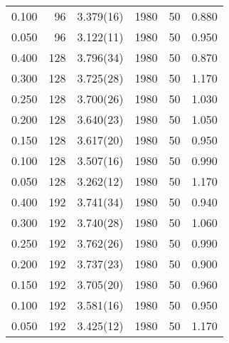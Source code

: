 \begin{tabular}{rrlrrr}
 0.100 &      96 & 3.379(16)  &                1980 &                  50 &    0.880 \\
 0.050 &      96 & 3.122(11)  &                1980 &                  50 &    0.950 \\
 0.400 &     128 & 3.796(34)  &                1980 &                  50 &    0.870 \\
 0.300 &     128 & 3.725(28)  &                1980 &                  50 &    1.170 \\
 0.250 &     128 & 3.700(26)  &                1980 &                  50 &    1.030 \\
 0.200 &     128 & 3.640(23)  &                1980 &                  50 &    1.050 \\
 0.150 &     128 & 3.617(20)  &                1980 &                  50 &    0.950 \\
 0.100 &     128 & 3.507(16)  &                1980 &                  50 &    0.990 \\
 0.050 &     128 & 3.262(12)  &                1980 &                  50 &    1.170 \\
 0.400 &     192 & 3.741(34)  &                1980 &                  50 &    0.940 \\
 0.300 &     192 & 3.740(28)  &                1980 &                  50 &    1.060 \\
 0.250 &     192 & 3.762(26)  &                1980 &                  50 &    0.990 \\
 0.200 &     192 & 3.737(23)  &                1980 &                  50 &    0.900 \\
 0.150 &     192 & 3.705(20)  &                1980 &                  50 &    0.960 \\
 0.100 &     192 & 3.581(16)  &                1980 &                  50 &    0.950 \\
 0.050 &     192 & 3.425(12)  &                1980 &                  50 &    1.170 \\
\hline
\end{tabular}
